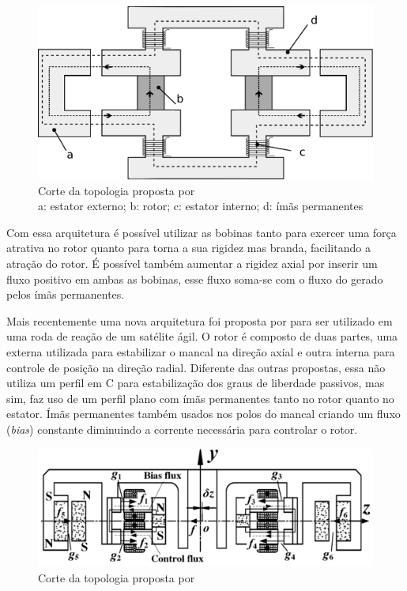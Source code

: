 
\begin{figure}[!ht]
	\centering
	\includegraphics[width=0.8\linewidth]{./Figs/mancais/alemao.pdf}
	\caption{Corte da topologia proposta por \cite{Scharfe2001} \\
	a: estator externo; b: rotor; c: estator interno; d: ímãs permanentes}
	\label{Fig:modelo:alemao}
\end{figure} 

Com essa arquitetura é possível utilizar as bobinas tanto para exercer uma força atrativa no rotor quanto para torna a sua rigidez mas branda, facilitando a atração do rotor. É possível também aumentar a rigidez axial por inserir um fluxo positivo em ambas as bobinas, esse fluxo soma-se com o fluxo do gerado pelos ímãs permanentes.

Mais recentemente uma nova arquitetura foi proposta por \citet{Bangcheng2012} para ser utilizado em uma roda de reação de um satélite ágil.  O rotor é composto de duas partes, uma externa utilizada para estabilizar o mancal na direção axial e outra interna para controle de posição na direção radial. Diferente das outras propostas, essa não utiliza um perfil em C para estabilização dos graus de liberdade passivos, mas sim, faz uso de um perfil plano com ímãs permanentes tanto no rotor quanto no estator.  Ímãs permanentes também usados nos polos do mancal criando um fluxo (\textit{bias}) constante diminuindo a corrente necessária para controlar o rotor.
 
\begin{figure}[!ht]
	\centering
	\includegraphics[width=1\linewidth]{./Figs/mancais/chines}
	\caption{Corte da topologia proposta por \cite{Bangcheng2012}}
	\label{Fig:modelo:chines}
\end{figure}

